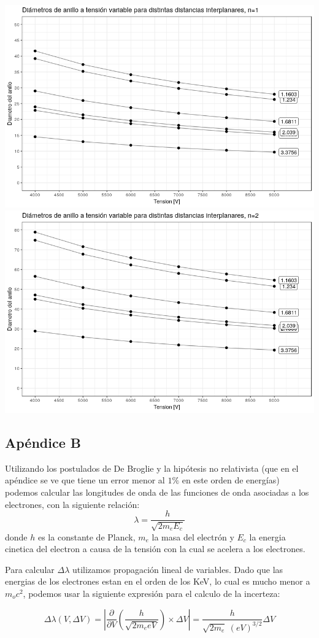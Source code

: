 \documentclass[]{article}
\begin{document}
\includegraphics{nivel_1.png} \includegraphics{nivel_2.png}

\newpage

\hypertarget{apuxe9ndice-b}{%
\subsection{Apéndice B}\label{apuxe9ndice-b}}

Utilizando los postulados de De Broglie y la hipótesis no relativista
(que en el apéndice se ve que tiene un error menor al \(1\%\) en este
orden de energías) podemos calcular las longitudes de onda de las
funciones de onda asociadas a los electrones, con la siguiente relación:
\[\lambda = \frac{h}{\sqrt{2m_e E_c}}\] donde \(h\) es la constante de
Planck, \(m_e\) la masa del electrón y \(E_c\) la energia cinetica del
electron a causa de la tensión con la cual se acelera a los electrones.

Para calcular \(\Delta \lambda\) utilizamos propagación lineal de
variables. Dado que las energias de los electrones estan en el orden de
los KeV, lo cual es mucho menor a \(m_o c^2\), podemos usar la siguiente
expresión para el calculo de la incerteza:

\[\Delta \lambda(V, \Delta V) =
\left |
    \frac{\partial}{\partial V} \left (
        \frac{h}{\sqrt{2m_e eV}}
    \right ) \times \Delta V
\right | = \frac{h}{\sqrt{2m_e}\ (eV)^{3/2}} \Delta V\]
\end{document}
